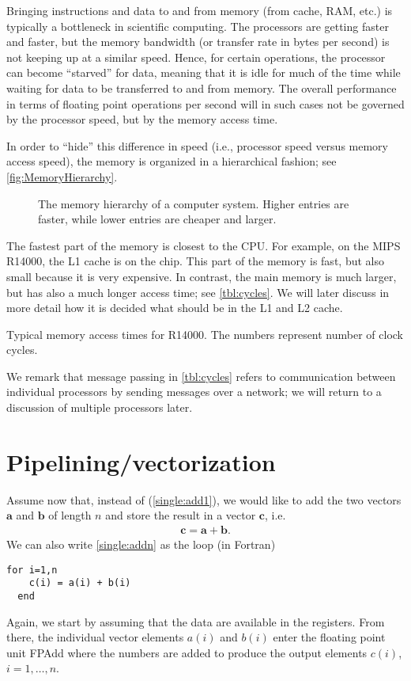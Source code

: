 Bringing instructions and data to and from memory (from cache, RAM, etc.) is
typically a bottleneck in scientific computing. The processors are getting
faster and faster, but the memory bandwidth (or transfer rate in bytes per
second) is not keeping up at a similar speed. Hence, for certain operations, the
processor can become ``starved'' for data, meaning that it is idle for much of
the time while waiting for data to be transferred to and from memory. The
overall performance in terms of floating point operations per second will in
such cases not be governed by the processor speed, but by the memory access
time.

In order to ``hide'' this difference in speed (i.e., processor speed versus
memory access speed), the memory is organized in a hierarchical fashion;
see \autoref{fig:MemoryHierarchy}.
\begin{figure}
  \centering
  
  \caption{
    The memory hierarchy of a computer system. Higher entries are faster, while
    lower entries are cheaper and larger.
  }
  \label{fig:MemoryHierarchy}
\end{figure}
The fastest part of the memory is closest to the CPU. For example, on the MIPS
R14000, the L1 cache is on the chip. This part of the memory is fast, but also
small because it is very expensive. In contrast, the main memory is much larger,
but has also a much longer access time; see \autoref{tbl:cycles}. We will later
discuss in more detail how it is decided what should be in the L1 and L2 cache.

\begin{table}
  \centering
  \caption{
    Typical memory access times for R14000. The numbers represent number of
    clock cycles.
  }
  \label{tbl:cycles}
  
\end{table}

We remark that message passing in \autoref{tbl:cycles} refers to communication
between individual processors by sending messages over a network; we will return
to a discussion of multiple processors later.

\section{Pipelining/vectorization}

Assume now that, instead of (\ref{single:add1}), we would like to add the two
vectors $\bm a$ and $\bm b$ of length $n$ and store the result in a vector $\bm
c$, i.e.
\begin{align}
  \bm c = \bm a + \bm b.
  \label{single:addn}
\end{align}
We can also write \eqref{single:addn} as the loop (in Fortran)
\begin{lstlisting}[style=fortran]
  for i=1,n
    c(i) = a(i) + b(i)
  end
\end{lstlisting}
Again, we start by assuming that the data are available in the registers. From
there, the individual vector elements $a(i)$ and $b(i)$ enter the floating point
unit FPAdd where the numbers are added to produce the output elements $c(i)$,
$i=1,\ldots,n$.

